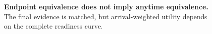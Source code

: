 \begin{figure}[t]
  \centering
  \caption{\textbf{Endpoint equivalence does not imply anytime equivalence.}
  The final evidence is matched, but arrival-weighted utility depends on the complete readiness curve.}
  \label{fig:reversal}
\end{figure}

